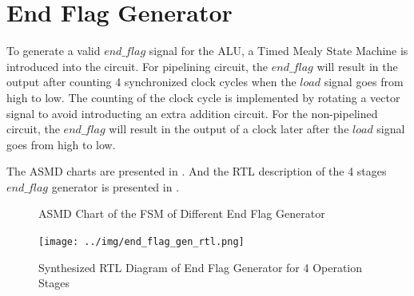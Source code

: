 \section{End Flag Generator}

To generate a valid \(end\_flag\) signal for the ALU, a Timed Mealy State Machine is introduced into the circuit.
For pipelining circuit, the \(end\_flag\) will result in the output after counting 4 synchronized clock cycles
when the \(load\) signal goes from high to low. The counting of the clock cycle is implemented by rotating a
vector signal to avoid introducting an extra addition circuit.
For the non-pipelined circuit, the \(end\_flag\) will result in the output of a clock later after the \(load\) signal goes from high to low.

The ASMD charts are presented in .
And the RTL description of the 4 stages \(end\_flag\) generator is presented in .

\begin{figure}[!ht]
	\centering
	\caption{ASMD Chart of the FSM of Different End Flag Generator}
	\label{fig:asmd}

	\hspace{1cm}

\end{figure}

\begin{figure}[!ht]
	\centering
	\caption{Synthesized RTL Diagram of End Flag Generator for 4 Operation Stages}
	\texttt{[image: ../img/end\_flag\_gen\_rtl.png]}
	\label{fig:end_flag_gen_rtl}
\end{figure}
